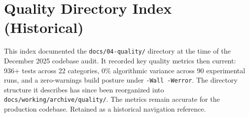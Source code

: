 
\section*{Quality Directory Index (Historical)}

This index documented the \texttt{docs/04-quality/} directory at the time of
the December 2025 codebase audit. It recorded key quality metrics then current:
936+ tests across 22 categories, 0\% algorithmic variance across 90
experimental runs, and a zero-warnings build posture under \texttt{-Wall
-Werror}. The directory structure it describes has since been reorganized into
\texttt{docs/working/archive/quality/}. The metrics remain accurate for the
production codebase. Retained as a historical navigation reference.

